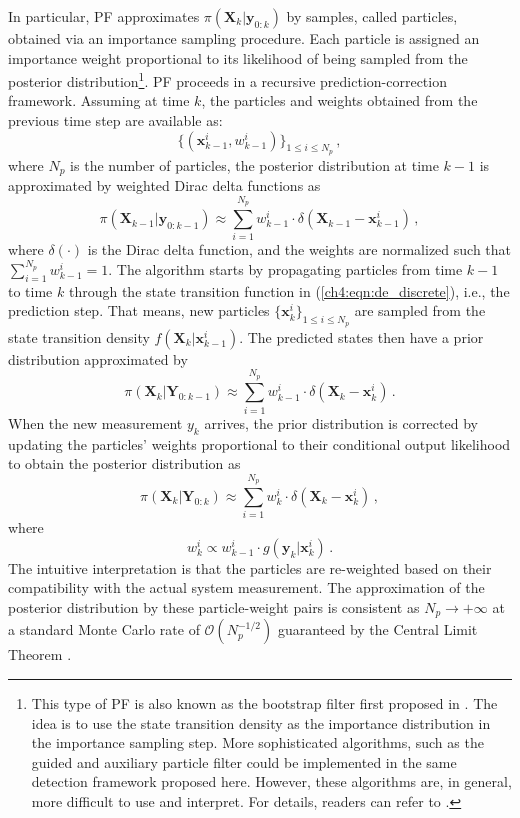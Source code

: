 In particular, PF approximates $\pi(\boldsymbol{X}_k | \boldsymbol{y}_{0:k})$ by samples, called particles, obtained via an importance sampling procedure. Each particle is assigned an importance weight proportional to its likelihood of being sampled from the posterior distribution\footnote{This type of PF is also known as the bootstrap filter first proposed in \cite{Gordon1993}. The idea is to use the state transition density as the importance distribution in the importance sampling step. More sophisticated algorithms, such as the guided and auxiliary particle filter could be implemented in the same detection framework proposed here. However, these algorithms are, in general, more difficult to use and interpret. For details, readers can refer to \cite{doucet2009tutorial}.}. PF proceeds in a recursive prediction-correction framework. Assuming at time $k$, the particles and weights obtained from the previous time step are available as:
$$
\{(\boldsymbol{x}_{k-1}^{i}, w_{k-1}^{i})\}_{1\leq i \leq N_p} \,,
$$ where $N_p$ is the number of particles, the posterior distribution at time $k-1$ is approximated by weighted Dirac delta functions as
\begin{equation}
\pi(\boldsymbol{X}_{k-1} | \boldsymbol{y}_{0:k-1}) \approx \sum_{i=1}^{N_{p}} w_{k-1}^{i} \cdot \delta(\boldsymbol{X}_{k-1}-\boldsymbol{x}_{k-1}^{i}) \,,
\end{equation} where $\delta (\cdot)$ is the Dirac delta function, and the weights are normalized such that $\sum_{i=1}^{N_{p}} w_{k-1}^{i} = 1$. The algorithm starts by propagating particles from time $k-1$ to time $k$ through the state transition function in (\ref{ch4:eqn:de_discrete}), i.e., the prediction step. That means, new particles $\{\boldsymbol{x}_k^{i}\}_{1\leq i \leq N_p}$ are sampled from the state transition density $f(\boldsymbol{X}_k|\boldsymbol{x}_{k-1}^{i})$. The predicted states then have a prior distribution approximated by 
\begin{equation}
\label{ch4:eqn:prediction}
\pi(\boldsymbol{X}_k | \boldsymbol{Y}_{0: k-1}) \approx \sum_{i=1}^{N_{p}} w_{k-1}^{i} \cdot \delta(\boldsymbol{X}_k-\boldsymbol{x}_k^{i}) \,.
\end{equation}
When the new measurement $y_k$ arrives, the prior distribution is corrected by updating the particles' weights proportional to their conditional output likelihood to obtain the posterior distribution as 
\begin{equation}
\label{ch4:eqn:particle_approx}
\pi(\boldsymbol{X}_k | \boldsymbol{Y}_{0: k}) \approx \sum_{i=1}^{N_{p}} w_k^{i} \cdot \delta(\boldsymbol{X}_k-\boldsymbol{x}_k^{i}) \,,
\end{equation} where 
$$
w_k^{i} \propto  w_{k-1}^{i} \cdot g(\boldsymbol{y}_k | \boldsymbol{x}_k^{i}) \,.
$$
The intuitive interpretation is that the particles are re-weighted based on their compatibility with the actual system measurement. The approximation of the posterior distribution by these particle-weight pairs is consistent as $N_p \rightarrow +\infty$ at a standard Monte Carlo rate of $\mathcal{O}(N_{p}^{-1/2})$ guaranteed by the Central Limit Theorem \cite{doucet2009tutorial}. 

